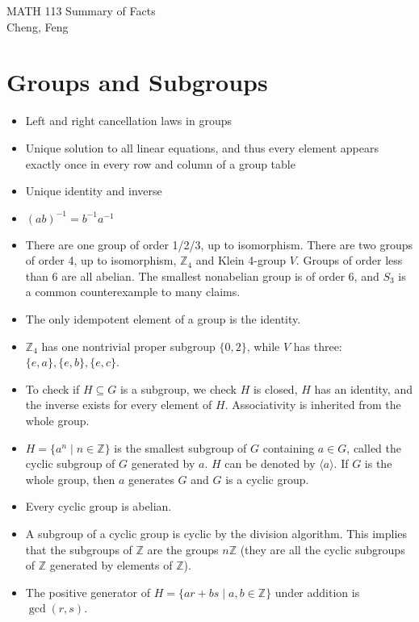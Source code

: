 \documentclass{article}
\newcommand{\Z}{\mathbb{Z}}
\begin{document}
\begin{center}
    {\Large MATH 113 Summary of Facts} \vspace{0.5em}
    \\ Cheng, Feng
    \vspace{-0.5em}
\end{center}

\section{Groups and Subgroups}
\begin{itemize}
    \item Left and right cancellation laws in groups
    \item Unique solution to all linear equations, and thus every element appears exactly once in every row and column of a group table
    \item Unique identity and inverse
    \item $(ab)^{-1}= b^{-1}a^{-1}$
    \item There are one group of order 1/2/3, up to isomorphism. There are two groups of order 4, up to isomorphism, $\Z_4$ and Klein 4-group $V$. Groups of order less than 6 are all abelian. The smallest nonabelian group is of order 6, and $S_3$ is a common counterexample to many claims.
    \item The only idempotent element of a group is the identity.
    \item $\Z_4$ has one nontrivial proper subgroup $\{0,2\}$, while $V$ has three: $\{e,a\}, \{e,b\},\{e,c\}$.
    \item To check if $H \subseteq G$ is a subgroup, we check $H$ is closed, $H$ has an identity, and the inverse exists for every element of $H$. Associativity is inherited from the whole group.
    \item $H = \{a^n \mid n \in \Z\}$ is the smallest subgroup of $G$ containing $a \in G$, called the cyclic subgroup of $G$ generated by $a$. $H$ can be denoted by $\langle a \rangle$. If $G$ is the whole group, then $a$ generates $G$ and $G$ is a cyclic group.
    \item Every cyclic group is abelian.
    \item A subgroup of a cyclic group is cyclic by the division algorithm. This implies that the subgroups of $\Z$ are the groups $n\Z$ (they are all the cyclic subgroups of $\Z$ generated by elements of $\Z$).
    \item The positive generator of $H = \{ar+bs \mid a,b \in \Z\}$ under addition is $\gcd(r,s)$.

\end{itemize}
\end{document}
